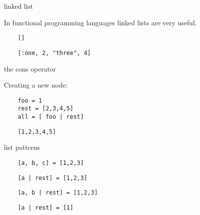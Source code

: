 \begin{frame}[fragile]{linked list}

  In functional programming languages linked lists are very useful.\pause

  \vspace{20pt}
  \begin{lstlisting}
    []
  \end{lstlisting}
  \vspace{10pt}\pause
  \begin{lstlisting}
    [:one, 2, "three", 4]
  \end{lstlisting}  
  
\end{frame}

\begin{frame}[fragile]{the cons operator}

  Creating a new node:\pause

  \vspace{20pt}
  \begin{lstlisting}
    foo = 1
    rest = [2,3,4,5]
    all = [ foo | rest] 
  \end{lstlisting}
  \vspace{10pt}\pause
  \begin{lstlisting}
    [1,2,3,4,5]
  \end{lstlisting}  
  
\end{frame}

\begin{frame}[fragile]{list patterns}

  \vspace{20pt}
  \begin{lstlisting}
    [a, b, c] = [1,2,3]
  \end{lstlisting}
  \vspace{10pt}\pause
  \begin{lstlisting}
    [a | rest] = [1,2,3]
  \end{lstlisting}  

  \vspace{10pt}\pause
  \begin{lstlisting}
    [a, b | rest] = [1,2,3]
  \end{lstlisting}    

  \vspace{10pt}\pause
  \begin{lstlisting}
    [a | rest] = [1]
  \end{lstlisting}    
\end{frame}


